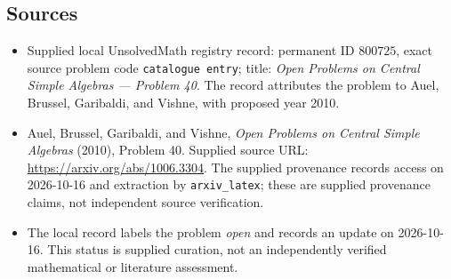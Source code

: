 \documentclass[11pt]{article}
\begin{document}
\subsection{Sources}
\begin{itemize}
\item Supplied local UnsolvedMath registry record: permanent ID \(800725\), exact source problem code \texttt{catalogue entry}; title: \emph{Open Problems on Central Simple Algebras --- Problem 40}. The record attributes the problem to Auel, Brussel, Garibaldi, and Vishne, with proposed year 2010.
\item Auel, Brussel, Garibaldi, and Vishne, \emph{Open Problems on Central Simple Algebras} (2010), Problem 40. Supplied source URL: \url{https://arxiv.org/abs/1006.3304}. The supplied provenance records access on 2026-10-16 and extraction by \texttt{arxiv\_latex}; these are supplied provenance claims, not independent source verification.
\item The local record labels the problem \emph{open} and records an update on 2026-10-16. This status is supplied curation, not an independently verified mathematical or literature assessment.
\end{itemize}
\end{document}
